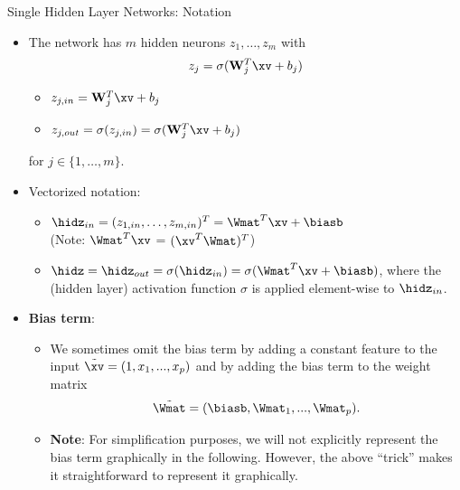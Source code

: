 \begin{vbframe}{Single Hidden Layer Networks: Notation}
  \begin{itemize}
    \vspace{4mm}
    \item The network has $m$ hidden neurons $z_1, \dots, z_m$ with
    $$ z_j = \sigma(\mathbf{W}_j^T \xv + b_j)$$
    \vspace{-0.5cm}
    \begin{itemize}
    \item $z_{j,in}  = \mathbf{W}_j^T \xv + b_j$
    \vspace{2mm}
    \item $z_{j,out} = \sigma(z_{j,in}) = \sigma(\mathbf{W}_j^T \xv + b_j)$
    \end{itemize}
    \vspace{4mm}
    for $j \in \{1,\ldots,m\}$.
    \vspace{4mm}

\item Vectorized notation:
\begin{itemize}
\item $ \hidz_{in} = (z_{1,in}, \dots, z_{m,in})^T = \Wmat^T \xv + \biasb$ \\ (Note: $\Wmat^T \xv$ = $(\xv^T \Wmat)^T$)
\item $ \hidz = \hidz_{out} = \sigma(\hidz_{in}) = \sigma(\Wmat^T \xv + \biasb)$, where the (hidden layer) activation function $\sigma$ is applied element-wise to $\hidz_{in}$.  
\end{itemize}
\framebreak
\item \textbf{Bias term}:         
\begin{itemize}
\item We sometimes omit the bias term by adding a constant feature to the input $\tilde{\xv} = (1, x_1, ..., x_p)$ and by adding the bias term to the weight matrix 
$$\tilde{\Wmat} = (\biasb, \Wmat_1, ..., \Wmat_p).$$ 
\item \textbf{Note}: For simplification purposes, we will not explicitly represent the bias term graphically in the following. However, the above \enquote{trick} makes it straightforward to represent it graphically. 
\end{itemize}
\end{itemize}
\framebreak


\end{vbframe}
